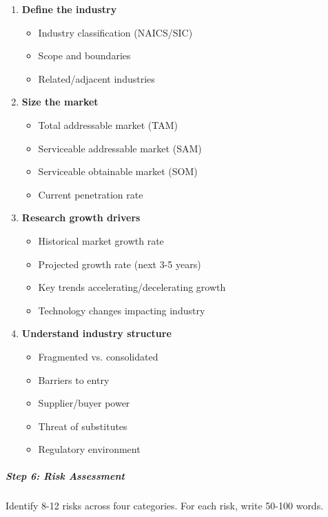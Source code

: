 \documentclass[11pt]{article}
\begin{document}
\begin{enumerate}[leftmargin=*,itemsep=2pt,topsep=2pt]
\item {} \textbf{Define the industry}
\begin{itemize}[leftmargin=*,itemsep=2pt,topsep=2pt]
\item {} Industry classification (NAICS/SIC)
\item {} Scope and boundaries
\item {} Related/adjacent industries
\end{itemize}
\item {} \textbf{Size the market}
\begin{itemize}[leftmargin=*,itemsep=2pt,topsep=2pt]
\item {} Total addressable market (TAM)
\item {} Serviceable addressable market (SAM)
\item {} Serviceable obtainable market (SOM)
\item {} Current penetration rate
\end{itemize}
\item {} \textbf{Research growth drivers}
\begin{itemize}[leftmargin=*,itemsep=2pt,topsep=2pt]
\item {} Historical market growth rate
\item {} Projected growth rate (next 3-5 years)
\item {} Key trends accelerating/decelerating growth
\item {} Technology changes impacting industry
\end{itemize}
\item {} \textbf{Understand industry structure}
\begin{itemize}[leftmargin=*,itemsep=2pt,topsep=2pt]
\item {} Fragmented vs. consolidated
\item {} Barriers to entry
\item {} Supplier/buyer power
\item {} Threat of substitutes
\item {} Regulatory environment
\end{itemize}
\end{enumerate}

\subparagraph{Step 6: Risk Assessment}\mbox{}\par

Identify 8-12 risks across four categories. For each risk, write 50-100 words.
\end{document}
